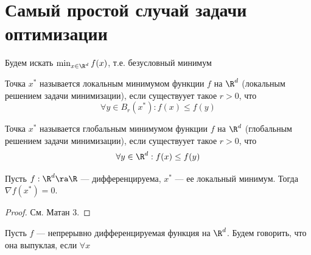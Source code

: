 
\section{Самый простой случай задачи оптимизации}
\begin{problem}
    Будем искать \(\min_{x \in \R^d} f(x)\), т.е. безусловный минимум
\end{problem}

\begin{definition}
    Точка \(x^*\) называется локальным минимумом функции \(f\) на \(\R^d\) (локальным решением задачи минимизации), если существуует такое \(r > 0\), что 
    \[\forall y \in B_r(x^*): f(x) \le f(y)\]
\end{definition}

\begin{definition}
    Точка \(x^*\) называется глобальным минимумом функции \(f\) на \(\R^d\) (глобальным решением задачи минимизации), если существуует такое \(r > 0\), что 
    \[\forall y \in \R^d: f(x) \le f(y)\]
\end{definition}

\begin{theorem}
    Пусть \(f: \R^d \ra \R\) --- дифференцируема, \(x^*\) --- ее локальный минимум. Тогда \(\nabla f(x^*) = 0\).
\end{theorem}
\begin{proof}
    См. Матан 3.
\end{proof}

\begin{definition}
    Пусть \(f\) --- непрерывно дифференцируемая функция на \(\R^d\). Будем говорить, что она выпуклая, если \(\forall x \)
\end{definition}
